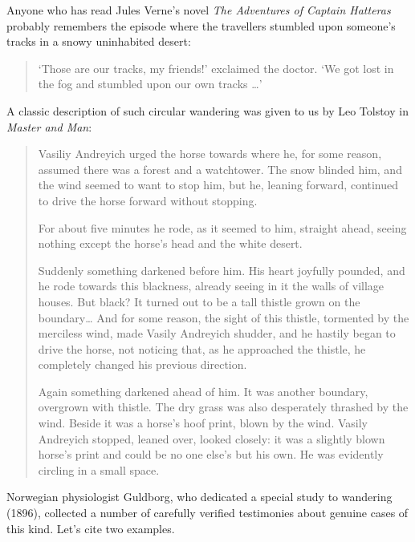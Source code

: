 Anyone who has read Jules Verne's novel \emph{The Adventures of Captain Hatteras} probably remembers the episode where the travellers stumbled upon someone's tracks in a snowy uninhabited desert:
\begin{quote}
`Those are our tracks, my friends!' exclaimed the doctor. `We got lost in the fog and stumbled upon our own tracks \dots{}'
\end{quote}
A classic description of such circular wandering was given to us by Leo Tolstoy in \emph{Master and Man}:
\begin{quote}
Vasiliy Andreyich urged the horse towards where he, for some reason, assumed there was a forest and a watchtower. The snow blinded him, and the wind seemed to want to stop him, but he, leaning forward, continued to drive the horse forward without stopping.

For about five minutes he rode, as it seemed to him, straight ahead, seeing nothing except the horse's head and the white desert.

Suddenly something darkened before him. His heart joyfully pounded, and he rode towards this blackness, already seeing in it the walls of village houses. But black? It turned out to be a tall thistle grown on the boundary\dots{} And for some reason, the sight of this thistle, tormented by the merciless wind, made Vasily Andreyich shudder, and he hastily began to drive the horse, not noticing that, as he approached the thistle, he completely changed his previous direction.

Again something darkened ahead of him. It was another boundary, overgrown with thistle. The dry grass was also desperately thrashed by the wind. Beside it was a horse's hoof print, blown by the wind. Vasily Andreyich stopped, leaned over, looked closely: it was a slightly blown horse's print and could be no one else's but his own. He was evidently circling in a small space.
\end{quote}

Norwegian physiologist Guldborg, who dedicated a special study to wandering (1896), collected a number of carefully verified testimonies about genuine cases of this kind. Let's cite two examples.

